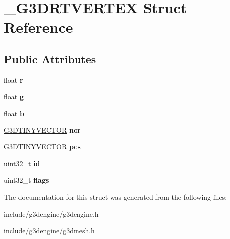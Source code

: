 \hypertarget{struct__G3DRTVERTEX}{}\section{\+\_\+\+G3\+D\+R\+T\+V\+E\+R\+T\+EX Struct Reference}
\label{struct__G3DRTVERTEX}
\subsection*{Public Attributes}
\begin{DoxyCompactItemize}
\item 
\mbox{\label{struct__G3DRTVERTEX_a48f80988544cba41bbde636b188bb86e}} 
float {\bfseries r}
\item 
\mbox{\label{struct__G3DRTVERTEX_a2c35305040f9b5ccb6d3c48f1cbe6455}} 
float {\bfseries g}
\item 
\mbox{\label{struct__G3DRTVERTEX_a0684976f953e9fc086d7ea75f82c422a}} 
float {\bfseries b}
\item 
\mbox{\label{struct__G3DRTVERTEX_aa81cc9c95673878bbbcdefea11c8c15e}} 
\hyperlink{struct__G3DTINYVECTOR}{G3\+D\+T\+I\+N\+Y\+V\+E\+C\+T\+OR} {\bfseries nor}
\item 
\mbox{\label{struct__G3DRTVERTEX_a002f1117ff092f49c28294081244ba5c}} 
\hyperlink{struct__G3DTINYVECTOR}{G3\+D\+T\+I\+N\+Y\+V\+E\+C\+T\+OR} {\bfseries pos}
\item 
\mbox{\label{struct__G3DRTVERTEX_a9e239d4d051bef8607eb199d736ea549}} 
uint32\+\_\+t {\bfseries id}
\item 
\mbox{\label{struct__G3DRTVERTEX_a00c7feffa675128bd7c82ff0151333c6}} 
uint32\+\_\+t {\bfseries flags}
\end{DoxyCompactItemize}


The documentation for this struct was generated from the following files\+:\begin{DoxyCompactItemize}
\item 
include/g3dengine/g3dengine.\+h\item 
include/g3dengine/g3dmesh.\+h\end{DoxyCompactItemize}
